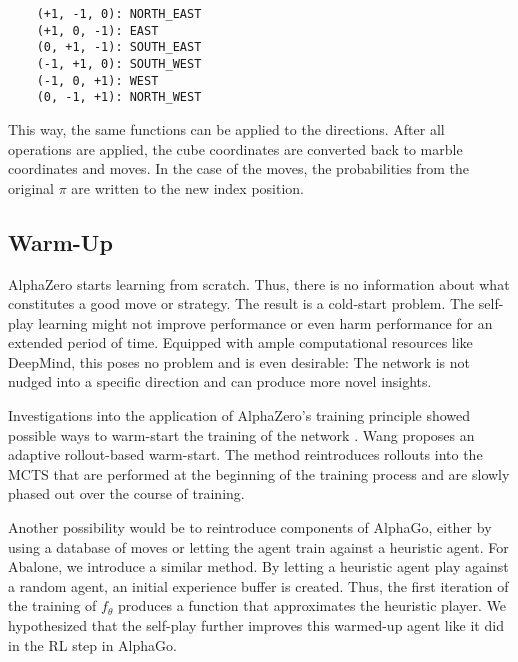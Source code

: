 \begin{BVerbatim}
    (+1, -1, 0): NORTH_EAST
    (+1, 0, -1): EAST
    (0, +1, -1): SOUTH_EAST
    (-1, +1, 0): SOUTH_WEST
    (-1, 0, +1): WEST
    (0, -1, +1): NORTH_WEST
\end{BVerbatim}

This way, the same functions can be applied to the directions. After all operations are applied, the cube coordinates are converted back to marble coordinates and moves. In the case of the moves, the probabilities from the original $\pi$ are written to the new index position.

\subsection{Warm-Up}
AlphaZero starts learning from scratch. Thus, there is no information about what constitutes a good move or strategy. The result is a cold-start problem. The self-play learning might not improve performance or even harm performance for an extended period of time. Equipped with ample computational resources like DeepMind, this poses no problem and is even desirable: The network is not nudged into a specific direction and can produce more novel insights.

Investigations into the application of AlphaZero's training principle showed possible ways to warm-start the training of the network \cite{wang_adaptive_2021}. Wang proposes an adaptive rollout-based warm-start. The method reintroduces rollouts into the MCTS that are performed at the beginning of the training process and are slowly phased out over the course of training.

Another possibility would be to reintroduce components of AlphaGo, either by using a database of moves or letting the agent train against a heuristic agent. For Abalone, we introduce a similar method. By letting a heuristic agent play against a random agent, an initial experience buffer is created. Thus, the first iteration of the training of $f_{\theta}$ produces a function that approximates the heuristic player. We hypothesized that the self-play further improves this warmed-up agent like it did in the RL step in AlphaGo.
